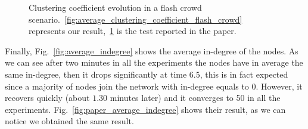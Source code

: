 \begin{figure}
\begin{subfigure}{.5\textwidth}
  \caption{}
  \label{fig:paper_average_clustering_coefficient_flash_crowd}
\end{subfigure}
\caption{Clustering coefficient evolution in a flash crowd scenario.~\ref{fig:average_clustering_coefficient_flash_crowd} represents our result,~\ref{fig:paper_average_clustering_coefficient_flash_crowd} is the test reported in the paper.}
\label{fig:robustness_cc_flash_crowd}
\end{figure}

Finally, Fig.~\ref{fig:average_indegree} shows the average in-degree of the nodes. As we can see after two minutes in all the experiments the nodes have in average the same in-degree, then it drops significantly at time $6.5$, this is in fact expected since a majority of nodes join the network with in-degree equals to $0$. However, it recovers quickly (about $1.30$ minutes later) and it converges to 50 in all the experiments. Fig.~\ref{fig:paper_average_indegree} shows their result, as we can notice we obtained the same result.

